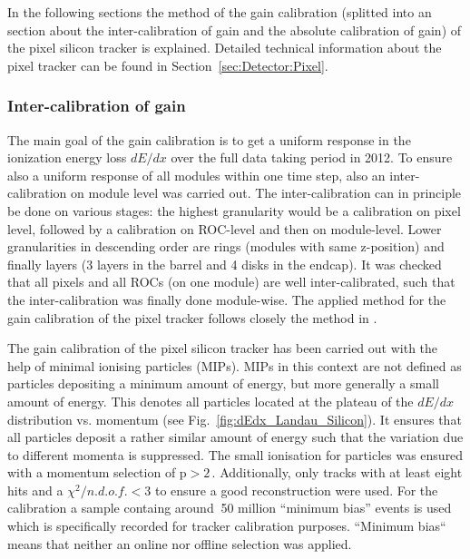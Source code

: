 In the following sections the method of the gain calibration (splitted into an section about the inter-calibration of gain and the absolute calibration of gain) of the pixel silicon tracker is explained. 
Detailed technical information about the pixel tracker can be found in Section~\ref{sec:Detector:Pixel}.


\subsubsection*{Inter-calibration of gain}
The main goal of the gain calibration is to get a uniform response in the ionization energy loss $dE/dx$ over the full data taking period in 2012.
To ensure also a uniform response of all modules within one time step, also an inter-calibration on module level was carried out.
The inter-calibration can in principle be done on various stages: the highest granularity would be a calibration on pixel level, followed by a calibration on ROC-level and then on module-level.
Lower granularities in descending order are rings (modules with same z-position) and finally layers (3 layers in the barrel and 4 disks in the endcap). 
It was checked that all pixels and all ROCs (on one module) are well inter-calibrated, such that the inter-calibration was finally done module-wise.
The applied method for the gain calibration of the pixel tracker follows closely the method in \cite{bib:Quertenmont_2010}.

The gain calibration of the pixel silicon tracker has been carried out with the help of minimal ionising particles (MIPs).
MIPs in this context are not defined as particles depositing a minimum amount of energy, but more generally a small amount of energy.
This denotes all particles located at the plateau of the $dE/dx$ distribution vs. momentum (see Fig.~\ref{fig:dEdx_Landau_Silicon}).
It ensures that all particles deposit a rather similar amount of energy such that the variation due to different momenta is suppressed.
The small ionisation for particles was ensured with a momentum selection of $\text{p}>2\,$\gev.
Additionally, only tracks with at least eight hits and a $\chi^2/n.d.o.f.<3$ to ensure a good reconstruction were used.
For the calibration a sample containg around $~$50 million ``minimum bias'' events is used which is specifically recorded for tracker calibration purposes.
``Minimum bias`` means that neither an online nor offline selection was applied.

